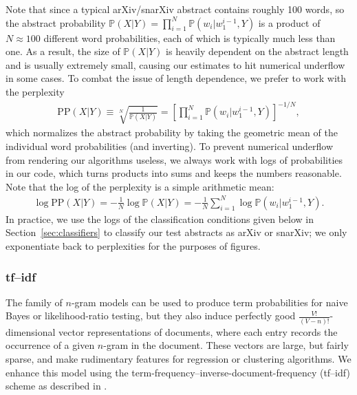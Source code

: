 \documentclass{article}
\renewcommand{\P}{\mathbb{P}}
\begin{document}
Note that since a typical arXiv/snarXiv abstract contains roughly 100 words, so the abstract probability $\P(X|Y)=\prod_{i=1}^N \P(w_i|w_1^{i-1},Y)$ is a product of $N\approx100$ different word probabilities, each of which is typically much less than one.
As a result, the size of $\P(X|Y)$ is heavily dependent on the abstract length and is usually extremely small, causing our estimates to hit numerical underflow in some cases.
To combat the issue of length dependence, we prefer to work with the perplexity
\begin{align}
  \text{PP}(X|Y) \equiv \sqrt[N]{\frac{1}{\P(X|Y)}} = \left[ \prod_{i=1}^N \P(w_i|w_1^{i-1},Y) \right]^{-1/N},
\end{align}
which normalizes the abstract probability by taking the geometric mean of the individual word probabilities (and inverting).
To prevent numerical underflow from rendering our algorithms useless, we always work with logs of probabilities in our code, which turns products into sums and keeps the numbers reasonable.
Note that the log of the perplexity is a simple arithmetic mean:
\begin{align}
  \log\text{PP}(X|Y) = -\frac{1}{N}\log\P(X|Y) = -\frac{1}{N} \sum_{i=1}^N \log\P(w_i|w_1^{i-1},Y).
\end{align}
In practice, we use the logs of the classification conditions given below in Section~\ref{sec:classifiers} to classify our test abstracts as arXiv or snarXiv; we only exponentiate back to perplexities for the purposes of figures.




\subsubsection{tf--idf}
The family of $n$-gram models can be used to produce term probabilities for naive Bayes or likelihood-ratio testing, but they also induce perfectly good $\tfrac{V!}{(V-n)!}$-dimensional vector representations of documents, where each entry records the occurrence of a given $n$-gram in the document.
These vectors are large, but fairly sparse, and make rudimentary features for regression or clustering algorithms. We enhance this model using the term-frequency--inverse-document-frequency (tf--idf) scheme as described in \citet[ch. 6]{jurafsky2014speech}.


\end{document}
